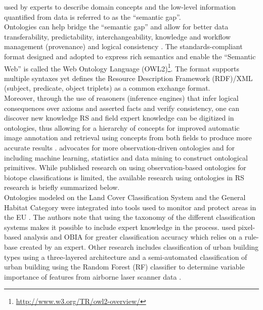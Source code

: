 \documentclass[authoryear, review,12pt,number]{elsarticle}
\begin{document}
used by experts to describe domain concepts and the low-level information
quantified from data is referred to as the ``semantic gap''.
\\
Ontologies can help bridge the ``semantic gap'' and allow for better data
transferability, predictability, interchangeability, knowledge and workflow
management (provenance) and logical consistency \citep{Janowicz2012}.  The
standards-compliant format designed and adopted to express rich semantics and
enable the ``Semantic Web'' is called the Web Ontology Language
(OWL2)\footnote{\url{http://www.w3.org/TR/owl2-overview/}}. The format supports
multiple syntaxes yet defines the Resource Description Framework (RDF)/XML
(subject, predicate, object triplets) as a common exchange format.
\\
Moreover, through the use of reasoners (inference engines) that infer logical
consequences over axioms and asserted facts and verify consistency, one can
discover new knowledge \citep{Arvor2013, Andres2013a}
RS and field expert
knowledge can be digitized in ontologies, thus allowing for a hierarchy of
concepts for improved automatic image annotation and retrieval using concepts
from both fields to produce more accurate results \citep{Srikanth_2005}.
\cite{Janowicz2012} advocates for more observation-driven ontologies and for
including machine learning, statistics and data mining to construct ontological
primitives. While published research on using observation-based ontologies for
biotope classifications is limited, the available research using ontologies in
RS research is briefly summarized below.\\
Ontologies modeled on the Land Cover Classification System and the General
Habitat Category were integrated into tools used to monitor and protect areas in
the EU \citep{Arvor2013}. The authors note that using the taxonomy of the
different classification systems makes it possible to include expert knowledge
in the process. 
\cite{Lucas2015} used pixel-based analysis and OBIA for greater classification
accuracy which relies on a rule-base created by an expert. Other research
includes classification of urban building types using a three-layered
architecture \citep{diSciascio2013} and a semi-automated classification of urban
building using the Random Forest (RF) classifier to determine variable
importance of features from airborne laser scanner data \citep{Belgiu2014}.
\end{document}
